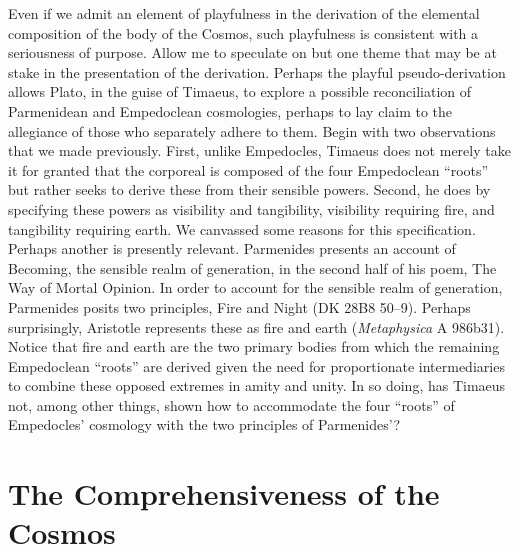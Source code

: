 Even if we admit an element of playfulness in the derivation of the elemental composition of the body of the Cosmos, such playfulness is consistent with a seriousness of purpose. Allow me to speculate on but one theme that may be at stake in the presentation of the derivation. Perhaps the playful pseudo-derivation allows Plato, in the guise of Timaeus, to explore a possible reconciliation of Parmenidean and Empedoclean cosmologies, perhaps to lay claim to the allegiance of those who separately adhere to them. Begin with two observations that we made previously. First, unlike Empedocles, Timaeus does not merely take it for granted that the corporeal is composed of the four Empedoclean ``roots'' but rather seeks to derive these from their sensible powers. Second, he does by specifying these powers as visibility and tangibility, visibility requiring fire, and tangibility requiring earth. We canvassed some reasons for this specification. Perhaps another is presently relevant. Parmenides presents an account of Becoming, the sensible realm of generation, in the second half of his poem, The Way of Mortal Opinion. In order to account for the sensible realm of generation, Parmenides posits two principles, Fire and Night (DK 28B8 50--9). Perhaps surprisingly, Aristotle represents these as fire and earth (\emph{Metaphysica} A 986b31). Notice that fire and earth are the two primary bodies from which the remaining Empedoclean ``roots'' are derived given the need for proportionate intermediaries to combine these opposed extremes in amity and unity. In so doing, has Timaeus not, among other things, shown how to accommodate the four ``roots'' of Empedocles' cosmology with the two principles of Parmenides'? 


\section{The Comprehensiveness of the Cosmos} %
\label{sec:the_comprehensiveness_of_the_Cosmos}

